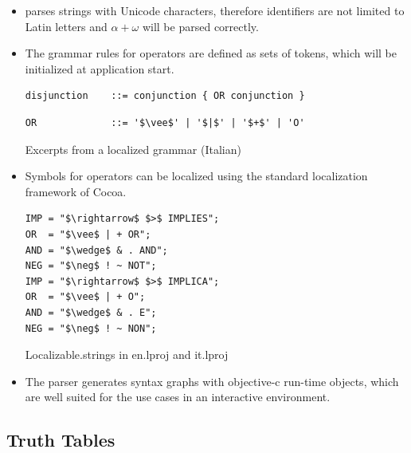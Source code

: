 \begin{itemize}

\item \Nyaya parses strings with Unicode characters, 
therefore identifiers are not limited to Latin letters and
$\alpha + \omega$ will be parsed correctly. 

\item The grammar rules for operators are defined as sets of tokens, 
which will be initialized at application start. 

\begin{table}[htdp]
\begin{center}
\begin{lstlisting}[mathescape,firstnumber=7]
disjunction    ::= conjunction { OR conjunction }
\end{lstlisting}
\begin{lstlisting}[mathescape,firstnumber=15]
OR             ::= '$\vee$' | '$|$' | '$+$' | 'O'
\end{lstlisting}
\caption{Excerpts from a localized grammar (Italian)}
\label{tab:LocalizedEBNF}
\end{center}
\end{table}

\item Symbols for operators
can be localized using the standard localization framework of Cocoa.

\begin{table}[htdp]
\begin{center}
\begin{lstlisting}[mathescape,numbers=none,multicols=2]
IMP = "$\rightarrow$ $>$ IMPLIES";
OR  = "$\vee$ | + OR";
AND = "$\wedge$ & . AND";
NEG = "$\neg$ ! ~ NOT";
IMP = "$\rightarrow$ $>$ IMPLICA";
OR  = "$\vee$ | + O";
AND = "$\wedge$ & . E";
NEG = "$\neg$ ! ~ NON";
\end{lstlisting}
\caption{Localizable.strings in en.lproj and it.lproj}
\label{tab:LocalizableStrings}
\end{center}
\end{table}


\item The parser generates syntax graphs with objective-c run-time objects,
which are well suited for the use cases in an interactive environment.

\end{itemize}

\subsection{Truth Tables}

